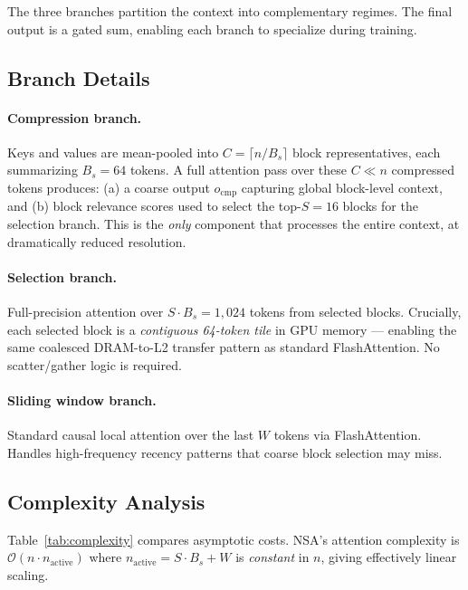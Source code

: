 \documentclass[10pt,twocolumn]{article}
\begin{document}
\noindent The three branches partition the context into complementary regimes.
The final output is a gated sum, enabling each branch to specialize during training.

\subsection{Branch Details}

\paragraph{Compression branch.}
Keys and values are mean-pooled into $C = \lceil n/B_s \rceil$ block representatives,
each summarizing $B_s=64$ tokens.
A full attention pass over these $C \ll n$ compressed tokens produces:
(a) a coarse output $o_\text{cmp}$ capturing global block-level context, and
(b) block relevance scores used to select the top-$S=16$ blocks for the selection branch.
This is the \emph{only} component that processes the entire context, at dramatically
reduced resolution.

\paragraph{Selection branch.}
Full-precision attention over $S \cdot B_s = 1{,}024$ tokens from selected blocks.
Crucially, each selected block is a \emph{contiguous 64-token tile} in GPU memory —
enabling the same coalesced DRAM-to-L2 transfer pattern as standard FlashAttention.
No scatter/gather logic is required.

\paragraph{Sliding window branch.}
Standard causal local attention over the last $W$ tokens via FlashAttention.
Handles high-frequency recency patterns that coarse block selection may miss.

\subsection{Complexity Analysis}

Table~\ref{tab:complexity} compares asymptotic costs.
NSA's attention complexity is $\mathcal{O}(n \cdot n_\text{active})$
where $n_\text{active} = S \cdot B_s + W$ is \emph{constant} in $n$,
giving effectively linear scaling.
\end{document}

